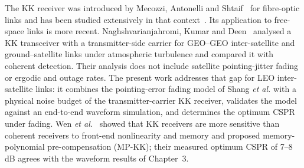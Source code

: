 The KK receiver was introduced by Mecozzi, Antonelli and Shtaif~\cite{mecozzi2016} for fibre-optic links and has been studied extensively in that context~\cite{mecozzi2019}. Its application to free-space links is more recent. Naghshvarianjahromi, Kumar and Deen~\cite{naghsh2022} analysed a KK transceiver with a transmitter-side carrier for GEO--GEO inter-satellite and ground--satellite links under atmospheric turbulence and compared it with coherent detection. Their analysis does not include satellite pointing-jitter fading or ergodic and outage rates. The present work addresses that gap for LEO inter-satellite links: it combines the pointing-error fading model of Shang \emph{et al.} with a physical noise budget of the transmitter-carrier KK receiver, validates the model against an end-to-end waveform simulation, and determines the optimum CSPR under fading. Wen \emph{et al.}~\cite{wen2023} showed that KK receivers are more sensitive than coherent receivers to front-end nonlinearity and memory and proposed memory-polynomial pre-compensation (MP-KK); their measured optimum CSPR of 7--8\,dB agrees with the waveform results of Chapter~3.
